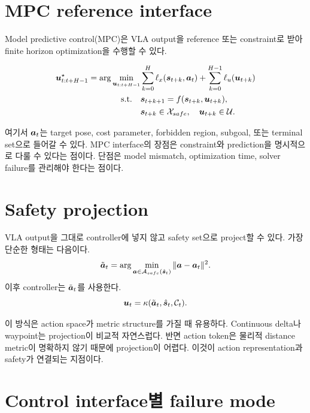 \section{MPC reference interface}

Model predictive control(MPC)은 VLA output을 reference 또는 constraint로 받아 finite horizon optimization을 수행할 수 있다.

\begin{equation}
\begin{aligned}
  \bm{u}_{t:t+H-1}^\star
  =
  \arg\min_{\bm{u}_{t:t+H-1}}
  &\sum_{k=0}^{H}
  \ell_x(\bm{s}_{t+k}, \bm{a}_t)
  +\sum_{k=0}^{H-1}\ell_u(\bm{u}_{t+k}) \\
  \text{s.t.}\quad
  &\bm{s}_{t+k+1}=f(\bm{s}_{t+k},\bm{u}_{t+k}),\\
  &\bm{s}_{t+k}\in\mathcal{X}_{safe},\quad
  \bm{u}_{t+k}\in\mathcal{U}.
\end{aligned}
\label{eq:mpc-vla}
\end{equation}

여기서 $\bm{a}_t$는 target pose, cost parameter, forbidden region, subgoal, 또는 terminal set으로 들어갈 수 있다. MPC interface의 장점은 constraint와 prediction을 명시적으로 다룰 수 있다는 점이다. 단점은 model mismatch, optimization time, solver failure를 관리해야 한다는 점이다.

\section{Safety projection}

VLA output을 그대로 controller에 넣지 않고 safety set으로 project할 수 있다. 가장 단순한 형태는 다음이다.
\begin{equation}
  \tilde{\bm{a}}_t
  =
  \arg\min_{\bm{a}\in\mathcal{A}_{safe}(\hat{\bm{s}}_t)}
  \|\bm{a}-\bm{a}_t\|^2.
  \label{eq:safety-projection}
\end{equation}
이후 controller는 $\tilde{\bm{a}}_t$를 사용한다.
\begin{equation}
  \bm{u}_t = \kappa(\tilde{\bm{a}}_t,\hat{\bm{s}}_t,\mathcal{C}_t).
  \label{eq:projected-control}
\end{equation}

이 방식은 action space가 metric structure를 가질 때 유용하다. Continuous delta나 waypoint는 projection이 비교적 자연스럽다. 반면 action token은 물리적 distance metric이 명확하지 않기 때문에 projection이 어렵다. 이것이 action representation과 safety가 연결되는 지점이다.

\section{Control interface별 failure mode}

